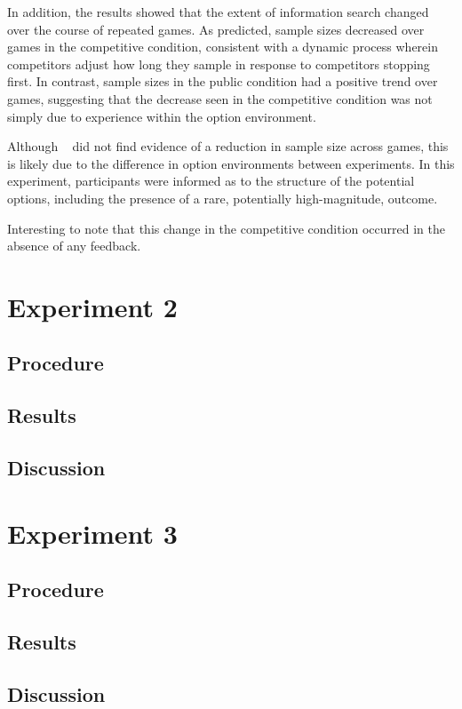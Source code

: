 \documentclass[11pt,jou]{apa6}
\begin{document}
In addition, the results showed that the extent of information search changed over the course of repeated games.
As predicted, sample sizes decreased over games in the competitive condition, consistent with a dynamic process wherein competitors adjust how long they sample in response to competitors stopping first.
In contrast, sample sizes in the public condition had a positive trend over games, suggesting that the decrease seen in the competitive condition was not simply due to experience within the option environment.

Although ~ did not find evidence of a reduction in sample size across games, this is likely due to the difference in option environments between experiments.
In this experiment, participants were informed as to the structure of the potential options, including the presence of a rare, potentially high-magnitude, outcome.

Interesting to note that this change in the competitive condition occurred in the absence of any feedback.


\section{Experiment 2}

\subsection{Procedure}

\subsection{Results}

\subsection{Discussion}



\section{Experiment 3}

\subsection{Procedure}

\subsection{Results}

\subsection{Discussion}




\end{document}
